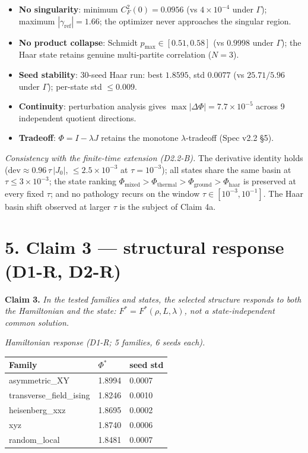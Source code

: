 \documentclass[
]{article}
\providecommand{\tightlist}{%
  \setlength{\itemsep}{0pt}\setlength{\parskip}{0pt}}
\begin{document}
\begin{itemize}
\tightlist
\item
  \textbf{No singularity}: minimum \(C_F^2(0) = 0.0956\) (vs
  \(4\times10^{-4}\) under \(\Gamma\)); maximum
  \(|\gamma_{\mathrm{ref}}| = 1.66\); the optimizer never approaches the
  singular region.
\item
  \textbf{No product collapse}: Schmidt \(p_{\max} \in [0.51, 0.58]\)
  (vs \(0.9998\) under \(\Gamma\)); the Haar state retains genuine
  multi-partite correlation (\(N=3\)).
\item
  \textbf{Seed stability}: 30-seed Haar run: best \(1.8595\), std
  \(0.0077\) (vs \(25.71 / 5.96\) under \(\Gamma\)); per-state std
  \(\le 0.009\).
\item
  \textbf{Continuity}: perturbation analysis gives \(\max|\Delta\Phi| =
  7.7\times10^{-5}\) across 9 independent quotient directions.
\item
  \textbf{Tradeoff}: \(\Phi = I - \lambda J\) retains the monotone
  \(\lambda\)-tradeoff (Spec v2.2 §5).
\end{itemize}

\emph{Consistency with the finite-time extension (D2.2-B).} The
derivative identity holds (\(\mathrm{dev} \approx 0.96\,\tau\,|J_0|\),
\(\le 2.5\times
10^{-3}\) at \(\tau=10^{-3}\)); all states share the same basin at
\(\tau \le 3\times10^{-3}\); the state ranking
\(\Phi_{\mathrm{mixed}} > \Phi_{\mathrm{thermal}} > \Phi_{\mathrm{ground}}
> \Phi_{\mathrm{haar}}\) is preserved at every fixed \(\tau\); and no
pathology recurs on the window \(\tau \in [10^{-3}, 10^{-1}]\). The Haar
basin shift observed at larger \(\tau\) is the subject of Claim 4a.

\section{5. Claim 3 --- structural response (D1-R,
D2-R)}\label{claim-3-structural-response-d1-r-d2-r}

\textbf{Claim 3.} \emph{In the tested families and states, the selected
structure responds to both the Hamiltonian and the state:
\(F^* = F^*(\rho, L,
\lambda)\), not a state-independent common solution.}

\emph{Hamiltonian response (D1-R; 5 families, 6 seeds each).}

{\def\LTcaptype{none} %
\begin{longtable}[]{@{}lll@{}}
\toprule\noalign{}
Family & \(\Phi^*\) & seed std \\
\midrule\noalign{}
\endhead
\bottomrule\noalign{}
\endlastfoot
asymmetric\_XY & 1.8994 & 0.0007 \\
transverse\_field\_ising & 1.8246 & 0.0010 \\
heisenberg\_xxz & 1.8695 & 0.0002 \\
xyz & 1.8740 & 0.0006 \\
random\_local & 1.8481 & 0.0007 \\
\end{longtable}
}
\end{document}
